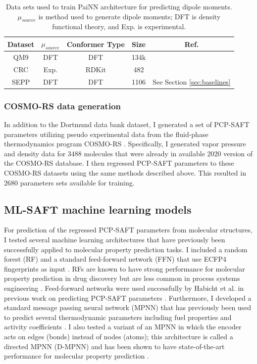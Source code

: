 \begin{table}[]
    \centering
    \caption{Data sets used to train PaiNN architecture for predicting dipole moments. $\mu_{source}$ is method used to generate dipole moments; DFT is density functional theory, and Exp. is experimental.}
    \begin{tabular}{ccccc}
         Dataset & $\mu_{source}$ & Conformer Type & Size & Ref.  \\
         \hline
         QM9 & DFT & DFT & 134k & \cite{Ramakrishnan2014}\\
         CRC & Exp. & RDKit\cite{Wang2020} & 482 & \cite{CRC2014} \\
         SEPP & DFT & DFT & 1106 & See Section \ref{sec:baselines} \\
         \hline
    \end{tabular}

    \label{tab:painn_data}
\end{table}

\subsubsection{COSMO-RS data generation}

In addition to the Dortmund data bank dataset, I generated a set of PCP-SAFT parameters utilizing pseudo experimental data from the fluid-phase thermodynamics program COSMO-RS \cite{Klamt2010}. Specifically, I generated vapor pressure and density data for 3488 molecules that were already in available 2020 version of the COSMO-RS database. I then regressed PCP-SAFT parameters to these COSMO-RS datasets using the same methods described above. This resulted in 2680 parameters sets available for training.

\subsection{ML-SAFT machine learning models}\label{subsec:ML-SAFT_model}

For prediction of the regressed PCP-SAFT parameters from molecular structures, I tested several machine learning architectures that have previously been successfully applied to molecular property prediction tasks. I included a random forest (RF) \cite{Breiman2001} and a standard feed-forward network (FFN) that use ECFP4 fingerprints as input \cite{Rogers2010}. RFs are known to have strong performance for molecular property prediction in drug discovery but are less common in process systems engineering \cite{Ramsundar2017, Yang2019}. Feed-forward networks were used successfully by Habicht et al. in previous work on predicting PCP-SAFT parameters \cite{Habicht2023}. Furthermore, I developed a standard message passing neural network (MPNN) \cite{Gilmer2017} that has previously been used to predict several thermodynamic parameters including fuel properties \cite{Schweidtmann2020} and activity coefficients \cite{SanchezMedina2022, Rittig2023}. I also tested a variant of an MPNN in which the encoder acts on edges (bonds) instead of nodes (atoms); this architecture is called a directed MPNN (D-MPNN) and has been shown to have state-of-the-art performance for molecular property prediction \cite{Yang2019, Vermeire2021}.


